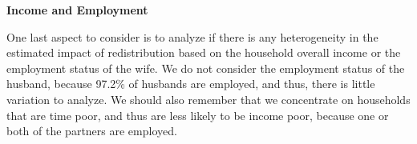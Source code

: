 \documentclass[
  11pt,
]{article}
\begin{document}
\textbf{Income and Employment}

One last aspect to consider is to analyze if there is any heterogeneity
in the estimated impact of redistribution based on the household overall
income or the employment status of the wife. We do not consider the
employment status of the husband, because 97.2\% of husbands are
employed, and thus, there is little variation to analyze. We should also
remember that we concentrate on households that are time poor, and thus
are less likely to be income poor, because one or both of the partners
are employed.

\begin{table}

\caption{\label{tbl-tb4}Time Poverty by Income}


\end{table}%
\end{document}
